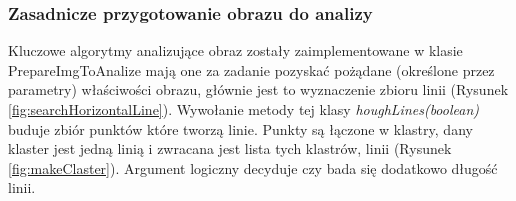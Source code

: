 \documentclass[a4paper,12pt]{article}
\newcommand\spacingIndent{2.2em}
\begin{document}
		\subsubsection{Zasadnicze przygotowanie obrazu do analizy}
	        \hspace{\spacingIndent} 
	        Kluczowe algorytmy analizujące obraz zostały zaimplementowane w klasie PrepareImgToAnalize mają one za zadanie pozyskać pożądane (określone przez parametry) właściwości obrazu, głównie jest to wyznaczenie zbioru     linii (Rysunek \ref{fig:searchHorizontalLine}). Wywołanie metody tej klasy \textit{houghLines(boolean)} buduje zbiór          punktów  które tworzą linie. Punkty są łączone w klastry, dany klaster      jest jedną linią i zwracana jest lista tych klastrów, linii (Rysunek \ref{fig:makeClaster}). Argument       logiczny decyduje czy bada się dodatkowo długość linii.
    		    
\end{document}
